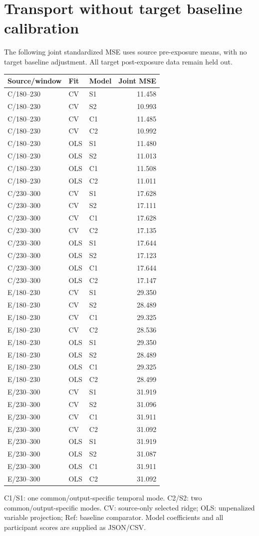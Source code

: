 \documentclass[11pt,a4paper]{article}
\begin{document}
\section{Transport without target baseline calibration}
The following joint standardized MSE uses source pre-exposure means, with no target baseline adjustment. All target post-exposure data remain held out.
\small\begin{longtable}{lllr}\toprule Source/window & Fit & Model & Joint MSE\\\midrule\endhead
C/180--230 & CV & S1 & 11.458\\
C/180--230 & CV & S2 & 10.993\\
C/180--230 & CV & C1 & 11.485\\
C/180--230 & CV & C2 & 10.992\\
C/180--230 & OLS & S1 & 11.480\\
C/180--230 & OLS & S2 & 11.013\\
C/180--230 & OLS & C1 & 11.508\\
C/180--230 & OLS & C2 & 11.011\\
C/230--300 & CV & S1 & 17.628\\
C/230--300 & CV & S2 & 17.111\\
C/230--300 & CV & C1 & 17.628\\
C/230--300 & CV & C2 & 17.135\\
C/230--300 & OLS & S1 & 17.644\\
C/230--300 & OLS & S2 & 17.123\\
C/230--300 & OLS & C1 & 17.644\\
C/230--300 & OLS & C2 & 17.147\\
E/180--230 & CV & S1 & 29.350\\
E/180--230 & CV & S2 & 28.489\\
E/180--230 & CV & C1 & 29.325\\
E/180--230 & CV & C2 & 28.536\\
E/180--230 & OLS & S1 & 29.350\\
E/180--230 & OLS & S2 & 28.489\\
E/180--230 & OLS & C1 & 29.325\\
E/180--230 & OLS & C2 & 28.499\\
E/230--300 & CV & S1 & 31.919\\
E/230--300 & CV & S2 & 31.096\\
E/230--300 & CV & C1 & 31.911\\
E/230--300 & CV & C2 & 31.092\\
E/230--300 & OLS & S1 & 31.919\\
E/230--300 & OLS & S2 & 31.087\\
E/230--300 & OLS & C1 & 31.911\\
E/230--300 & OLS & C2 & 31.092\\
\bottomrule\end{longtable}\normalsize
C1/S1: one common/output-specific temporal mode. C2/S2: two common/output-specific modes. CV: source-only selected ridge; OLS: unpenalized variable projection; Ref: baseline comparator. Model coefficients and all participant scores are supplied as JSON/CSV.
\end{document}

